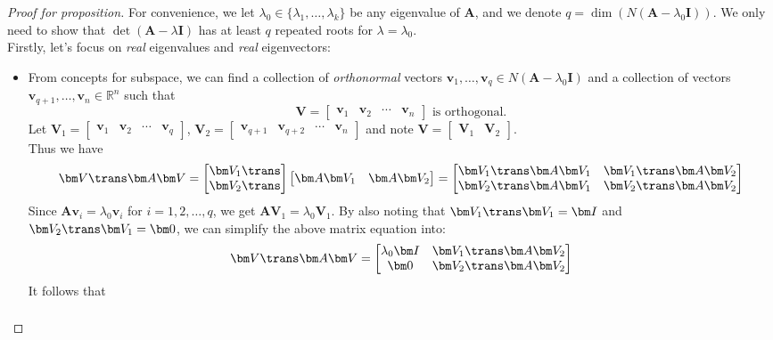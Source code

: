 \begin{proof}[Proof for proposition]
For convenience, we let $\lambda_0\in\{\lambda_1,\dots,\lambda_k\}$ be any eigenvalue of $\bm A$, and we denote $q=\dim(N(\bm A-\lambda_0\bm I))$. We only need to show that $\det(\bm A-\lambda\bm I)$ has at least $q$ repeated roots for $\lambda=\lambda_0$.\\
Firstly, let's focus on \emph{real} eigenvalues and \emph{real} eigenvectors:
\begin{itemize}
\item
From concepts for subspace, we can find a collection of \emph{orthonormal} vectors $\bm v_1,\dots,\bm v_q\in N(\bm A-\lambda_0\bm I)$ and a collection of vectors $\bm v_{q+1},\dots,\bm v_n\in\mathbb{R}^n$ such that
\[
\bm V=\begin{bmatrix}
\bm v_1&\bm v_2&\cdots&\bm v_n
\end{bmatrix}\text{ is orthogonal}.
\]
Let $\bm V_1=\begin{bmatrix}
\bm v_1&\bm v_2&\cdots&\bm v_q
\end{bmatrix}$, $\bm V_2=\begin{bmatrix}
\bm v_{q+1}&\bm v_{q+2}&\cdots&\bm v_{n}
\end{bmatrix}$ and note $\bm V=\begin{bmatrix}
\bm V_1&\bm V_2
\end{bmatrix}$.\\
Thus we have
\[
\bm V\trans\bm A\bm V=\begin{bmatrix}
\bm V_1\trans\\\bm V_2\trans
\end{bmatrix}\begin{bmatrix}
\bm A\bm V_1&\bm A\bm V_2
\end{bmatrix}=\begin{bmatrix}
\bm V_1\trans\bm A\bm V_1
&
\bm V_1\trans\bm A\bm V_2\\
\bm V_2\trans\bm A\bm V_1&
\bm V_2\trans\bm A\bm V_2
\end{bmatrix}
\]
Since $\bm A\bm v_i=\lambda_0\bm v_i$ for $i=1,2,\dots,q$, we get $\bm A\bm V_1=\lambda_0\bm V_1$. By also noting that $\bm V_1\trans\bm V_1=\bm I$ and $\bm V_2\trans\bm V_1=\bm0$, we can simplify the above matrix equation into:
\[
\bm V\trans\bm A\bm V=
\begin{bmatrix}
\lambda_0\bm I
&
\bm V_1\trans\bm A\bm V_2\\
\bm0&
\bm V_2\trans\bm A\bm V_2
\end{bmatrix}
\]
It follows that
\begin{align*}

\end{align*}
\end{itemize}
\end{proof}
